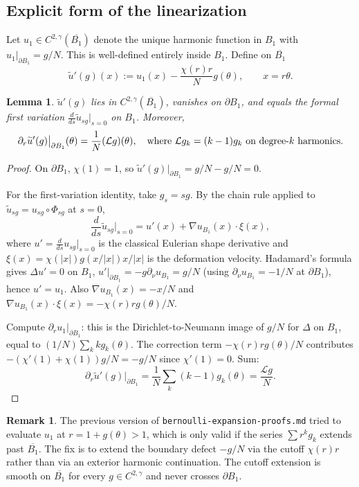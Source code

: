 \documentclass[11pt]{article}
\newtheorem{lemma}[theorem]{Lemma}
\theoremstyle{definition}
\newtheorem{remark}[theorem]{Remark}
\newcommand{\abs}[1]{\left|#1\right|}
\begin{document}
\subsection{Explicit form of the linearization}

Let $u_1\in C^{2,\gamma}(\overline{B_1})$ denote the unique harmonic function
in $B_1$ with $u_1\big|_{\partial B_1}=g/N$. This is well-defined entirely
inside $B_1$. Define on $\overline{B_1}$
\begin{equation}\label{eq:utilde'}
\widetilde u'(g)(x)
:=u_1(x)-\frac{\chi(r)r}{N}g(\theta),
\qquad x=r\theta.
\end{equation}

\begin{lemma}\label{lem:firstvar}
$\widetilde u'(g)$ lies in $C^{2,\gamma}(\overline{B_1})$, vanishes on
$\partial B_1$, and equals the formal first variation
$\frac{d}{ds}\widetilde u_{sg}\big|_{s=0}$ on $B_1$. Moreover,
\[
\partial_r\widetilde u'(g)\big|_{\partial B_1}(\theta)
=\frac{1}{N}(\mathcal L g)(\theta),
\quad\hbox{where }\mathcal L g_k=(k-1)g_k\hbox{ on degree-}k\hbox{ harmonics}.
\]
\end{lemma}

\begin{proof}
On $\partial B_1$, $\chi(1)=1$, so
$\widetilde u'(g)\big|_{\partial B_1}=g/N-g/N=0$.

For the first-variation identity, take $g_s=sg$. By the chain rule applied
to $\widetilde u_{sg}=u_{sg}\circ\Phi_{sg}$ at $s=0$,
\[
\frac{d}{ds}\widetilde u_{sg}\big|_{s=0}
=u'(x)+\nabla u_{B_1}(x)\cdot\xi(x),
\]
where $u'=\frac{d}{ds}u_{sg}\big|_{s=0}$ is the classical Eulerian shape
derivative and $\xi(x)=\chi(\abs x)g(x/\abs x)x/\abs x$ is the deformation
velocity. Hadamard's formula gives $\Delta u'=0$ on $B_1$,
$u'\big|_{\partial B_1}=-g\partial_\nu u_{B_1}=g/N$ (using
$\partial_\nu u_{B_1}=-1/N$ at $\partial B_1$), hence $u'=u_1$. Also
$\nabla u_{B_1}(x)=-x/N$ and $\nabla u_{B_1}(x)\cdot\xi(x)
=-\chi(r)rg(\theta)/N$.

Compute $\partial_r u_1\big|_{\partial B_1}$: this is the
Dirichlet-to-Neumann image of $g/N$ for $\Delta$ on $B_1$, equal to
$(1/N)\sum_k kg_k(\theta)$. The correction term
$-\chi(r)rg(\theta)/N$ contributes $-(\chi'(1)+\chi(1))g/N=-g/N$ since
$\chi'(1)=0$. Sum:
\[
\partial_r\widetilde u'(g)\big|_{\partial B_1}
=\frac{1}{N}\sum_k(k-1)g_k(\theta)=\frac{\mathcal L g}{N}.
\]
\end{proof}

\begin{remark}
The previous version of \texttt{bernoulli-expansion-proofs.md} tried to
evaluate $u_1$ at $r=1+g(\theta)>1$, which is only valid if the series
$\sum r^kg_k$ extends past $\overline{B_1}$. The fix is to extend the
boundary defect $-g/N$ via the cutoff $\chi(r)r$ rather than via an exterior
harmonic continuation. The cutoff extension is smooth on $\overline{B_1}$
for every $g\in C^{2,\gamma}$ and never crosses $\partial B_1$.
\end{remark}
\end{document}

